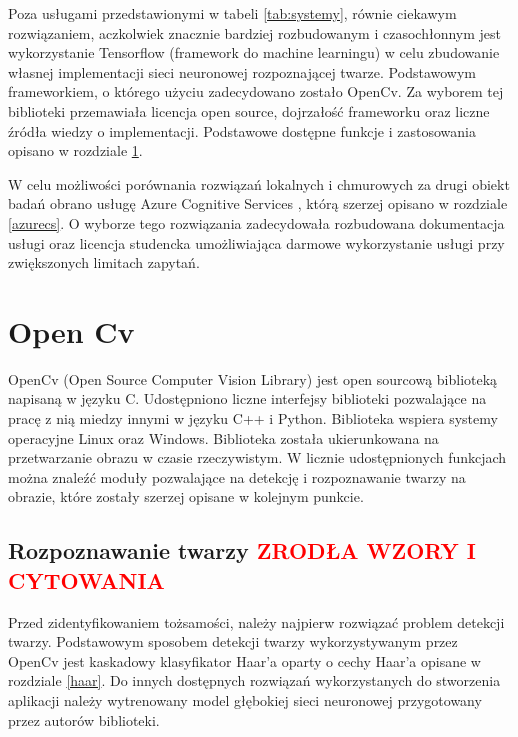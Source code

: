 Poza usługami przedstawionymi w tabeli \ref{tab:systemy}, równie ciekawym rozwiązaniem, aczkolwiek znacznie bardziej rozbudowanym i czasochłonnym jest wykorzystanie Tensorflow \cite{tensorflow} (framework do machine learningu) w celu zbudowanie własnej implementacji sieci neuronowej rozpoznającej twarze.
Podstawowym frameworkiem, o którego użyciu zadecydowano zostało OpenCv. Za wyborem tej biblioteki przemawiała licencja open source, dojrzałość frameworku oraz liczne źródła wiedzy o implementacji. Podstawowe dostępne funkcje i zastosowania opisano w rozdziale \ref{s:open_cv}.

W celu możliwości porównania rozwiązań lokalnych i chmurowych za drugi obiekt badań obrano usługę Azure Cognitive Services \cite{azure}, którą szerzej opisano w rozdziale \ref{azurecs}. O wyborze tego rozwiązania zadecydowała rozbudowana dokumentacja usługi oraz licencja studencka umożliwiająca darmowe wykorzystanie usługi przy zwiększonych limitach zapytań.

\section{Open Cv} \label{s:open_cv}
OpenCv (Open Source Computer Vision Library) jest open sourcową biblioteką napisaną w języku C. Udostępniono liczne interfejsy biblioteki pozwalające na pracę z nią miedzy innymi w języku C++ i Python. Biblioteka wspiera systemy operacyjne Linux oraz Windows. Biblioteka została ukierunkowana na przetwarzanie obrazu w czasie rzeczywistym. W licznie udostępnionych funkcjach można znaleźć moduły pozwalające na detekcję i rozpoznawanie twarzy na obrazie, które zostały szerzej opisane w kolejnym punkcie.

\subsection{Rozpoznawanie twarzy \textcolor{red}{ZRODŁA WZORY I CYTOWANIA}}
Przed zidentyfikowaniem tożsamości, należy najpierw rozwiązać problem detekcji twarzy. Podstawowym sposobem detekcji twarzy wykorzystywanym przez OpenCv jest kaskadowy klasyfikator Haar'a oparty o cechy Haar'a opisane w rozdziale \ref{haar}. Do innych dostępnych rozwiązań wykorzystanych do stworzenia aplikacji należy wytrenowany model głębokiej sieci neuronowej przygotowany przez autorów biblioteki.

